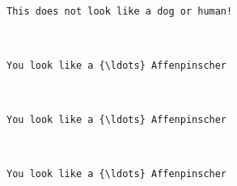 \documentclass[11pt]{article}
\begin{document}
    \begin{center}
    \end{center}
    { \hspace*{\fill} \\}
    
    \begin{Verbatim}[commandchars=\\\{\}]
This does not look like a dog or human!

    \end{Verbatim}

    \begin{center}
    \end{center}
    { \hspace*{\fill} \\}
    
    \begin{Verbatim}[commandchars=\\\{\}]
You look like a {\ldots} Affenpinscher

    \end{Verbatim}

    \begin{center}
    \end{center}
    { \hspace*{\fill} \\}
    
    \begin{Verbatim}[commandchars=\\\{\}]
You look like a {\ldots} Affenpinscher

    \end{Verbatim}

    \begin{center}
    \end{center}
    { \hspace*{\fill} \\}
    
    \begin{Verbatim}[commandchars=\\\{\}]
You look like a {\ldots} Affenpinscher

    \end{Verbatim}


    
    
    
    
\end{document}
